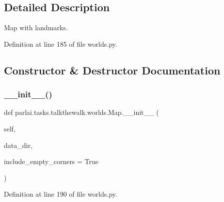 \subsection{Detailed Description}
\begin{DoxyVerb}Map with landmarks.
\end{DoxyVerb}
 

Definition at line 185 of file worlds.\+py.



\subsection{Constructor \& Destructor Documentation}
\mbox{\label{classparlai_1_1tasks_1_1talkthewalk_1_1worlds_1_1Map_a09c659a2c010b978fb69b4f578088e3b}} 
\subsubsection{\texorpdfstring{\+\_\+\+\_\+init\+\_\+\+\_\+()}{\_\_init\_\_()}}
{\footnotesize\ttfamily def parlai.\+tasks.\+talkthewalk.\+worlds.\+Map.\+\_\+\+\_\+init\+\_\+\+\_\+ (\begin{DoxyParamCaption}\item[{}]{self,  }\item[{}]{data\+\_\+dir,  }\item[{}]{include\+\_\+empty\+\_\+corners = {\ttfamily True} }\end{DoxyParamCaption})}



Definition at line 190 of file worlds.\+py.


